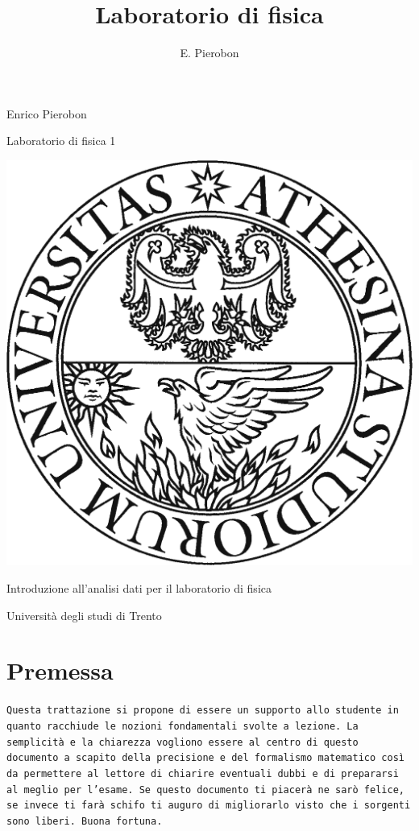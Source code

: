 \documentclass[11pt,a4paper]{book}
\author{E. Pierobon}
\title{Laboratorio di fisica}
\begin{document}
\frontmatter
\begin{titlepage}
\centering
{\large Enrico Pierobon \par}
{\Huge Laboratorio di fisica 1\par}
\includegraphics[width=\columnwidth]{./UniversitaDiTrento}
\vspace{24pt}
{\huge Introduzione all'analisi dati per il laboratorio di fisica\par}
{\small Università degli studi di Trento \par}
\end{titlepage}

\section*{Premessa}
\begin{center}
\texttt{Questa trattazione si propone di essere un supporto allo studente in quanto racchiude le nozioni fondamentali svolte a lezione. La semplicità e la chiarezza vogliono essere al centro di questo documento a scapito della precisione e del formalismo matematico così da permettere al lettore di chiarire eventuali dubbi e di prepararsi al meglio per l'esame. Se questo documento ti piacerà ne sarò felice, se invece ti farà schifo ti auguro di migliorarlo visto che i sorgenti sono liberi. Buona fortuna.}
\end{center}
\tableofcontents
\mainmatter
\end{document}
